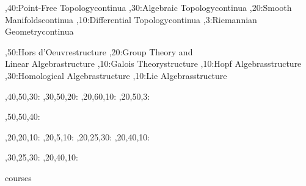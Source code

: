 \documentclass{article}
\begin{document}
	
	\begin{chart}%
		\begin{scope}[every rectangle node/.style={
				sharp corners,
				line width=0.6pt,
				fill=gray!15
			}]
			,40:{}{Point-Free Topology}{continua}
			,30:{}{Algebraic Topology}{continua}
			,20:{}{Smooth Manifolds}{continua}
			,10:{}{Differential Topology}{continua}		
			,3:{}{Riemannian Geometry}{continua}

			,50:{}{Hors d'Oeuvre}{structure}
			,20:{}{Group Theory and\\Linear Algebra}{structure}
			,10:{}{Galois Theory}{structure}		
			,10:{}{Hopf Algebras}{structure}
			,30:{}{Homological Algebra}{structure}
			,10:{}{Lie Algebras}{structure}
		\end{scope}
		
		,40,50,30:
		,30,50,20:
		,20,60,10:
		,20,50,3:
		
		,50,50,40:

		,20,20,10:
		,20,5,10:
		,20,25,30:
		,20,40,10:
		
		,30,25,30:
		,20,40,10:
		
		\begin{pgfonlayer}{courses}
		\end{pgfonlayer}
	\end{chart}
	
\end{document}
